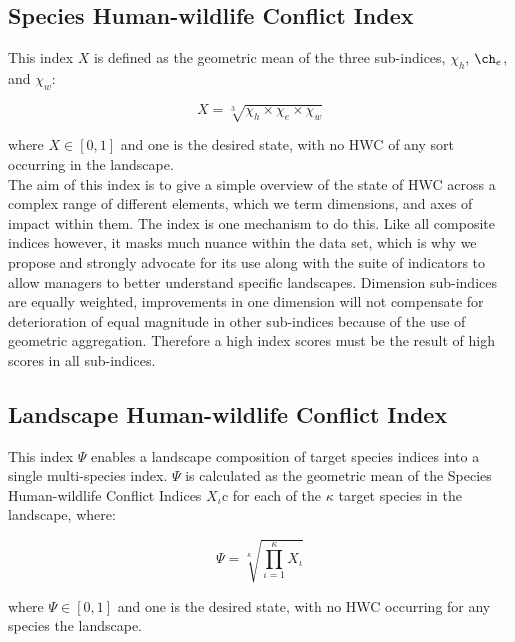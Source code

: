 \documentclass[fleqn,10pt]{olplainarticle}
\begin{document}
\subsection*{Species Human-wildlife Conflict Index}
This index $X$ is defined as the geometric mean of the three sub-indices, $\chi_h$, $\ch_e$, and $\chi_w$:

\begin{equation*}
    X = \sqrt[3]{\chi_h \times \chi_e \times \chi_w}
\end{equation*}

where $X \in [0,1]$ and one is the desired state, with no HWC of any sort occurring in the landscape.\\

The aim of this index is to give a simple overview of the state of HWC across a complex range of different elements, which we term dimensions, and axes of impact within them. The index is one mechanism to do this. Like all composite indices however, it masks much nuance within the data set, which is why we propose and strongly advocate for its use along with the suite of indicators to allow managers to better understand specific landscapes.
Dimension sub-indices are equally weighted, improvements in one dimension will not compensate for deterioration of equal magnitude in other sub-indices because of the use of geometric aggregation. Therefore a high index scores must be the result of high scores in all sub-indices.

\subsection*{Landscape Human-wildlife Conflict Index}
This index $\Psi$ enables a landscape composition of target species indices into a single multi-species index. $\Psi$ is calculated as the geometric mean of the Species Human-wildlife Conflict Indices $X_\iota$c for each of the $\kappa$ target species in the landscape, where:

\begin{equation*}
    \Psi = \sqrt[\kappa]{\prod_{\iota=1}^{\kappa} X_\iota }
\end{equation*}

where $\Psi \in [0,1]$ and one is the desired state, with no HWC occurring for any species the landscape.\\
\end{document}
